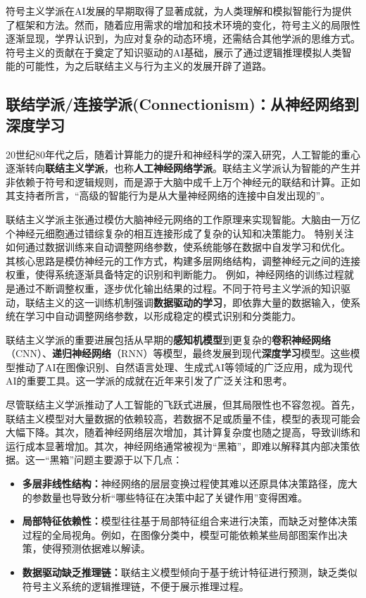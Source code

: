  符号主义学派在AI发展的早期取得了显著成就，为人类理解和模拟智能行为提供了框架和方法。然而，随着应用需求的增加和技术环境的变化，符号主义的局限性逐渐显现，学界认识到，为应对复杂的动态环境，还需结合其他学派的思维方式。符号主义的贡献在于奠定了知识驱动的AI基础，展示了通过逻辑推理模拟人类智能的可能性，为之后联结主义与行为主义的发展开辟了道路。

\subsection{联结学派/连接学派(Connectionism)：从神经网络到深度学习}
 20世纪80年代之后，随着计算能力的提升和神经科学的深入研究，人工智能的重心逐渐转向{\bf 联结主义学派}，也称{\bf 人工神经网络学派}。联结主义学派认为智能的产生并非依赖于符号和逻辑规则，而是源于大脑中成千上万个神经元的联结和计算。正如其支持者所言，“高级的智能行为是从大量神经网络的连接中自发出现的”。
  
联结主义学派主张通过模仿大脑神经元网络的工作原理来实现智能。大脑由一万亿个神经元细胞通过错综复杂的相互连接形成了复杂的认知和决策能力。
特别关注如何通过数据训练来自动调整网络参数，使系统能够在数据中自发学习和优化。
其核心思路是模仿神经元的工作方式，构建多层网络结构，调整神经元之间的连接权重，使得系统逐渐具备特定的识别和判断能力。
例如，神经网络的训练过程就是通过不断调整权重，逐步优化输出结果的过程。不同于符号主义学派的知识驱动，联结主义的这一训练机制强调{\bf 数据驱动的学习}，即依靠大量的数据输入，使系统在学习中自动调整网络参数，以形成稳定的模式识别和分类能力。

联结主义学派的重要进展包括从早期的{\bf 感知机模型}到更复杂的{\bf 卷积神经网络}（CNN）、{\bf 递归神经网络}（RNN）等模型，最终发展到现代{\bf 深度学习}模型。这些模型推动了AI在图像识别、自然语言处理、生成式AI等领域的广泛应用，成为现代AI的重要工具。这一学派的成就在近年来引发了广泛关注和思考。

尽管联结主义学派推动了人工智能的飞跃式进展，但其局限性也不容忽视。首先，联结主义模型对大量数据的依赖较高，若数据不足或质量不佳，模型的表现可能会大幅下降。其次，随着神经网络层次增加，其计算复杂度也随之提高，导致训练和运行成本显著增加。其次，神经网络通常被视为“黑箱”，即难以解释其内部决策依据。这一“黑箱”问题主要源于以下几点：
\begin{itemize}
\item {\bf 多层非线性结构：}神经网络的层层变换过程使其难以还原具体决策路径，庞大的参数量也导致分析“哪些特征在决策中起了关键作用”变得困难。
\item {\bf 局部特征依赖性：}模型往往基于局部特征组合来进行决策，而缺乏对整体决策过程的全局视角。例如，在图像分类中，模型可能依赖某些局部图案作出决策，使得预测依据难以解读。
\item {\bf 数据驱动缺乏推理链：}联结主义模型倾向于基于统计特征进行预测，缺乏类似符号主义系统的逻辑推理链，不便于展示推理过程。
\end{itemize}

